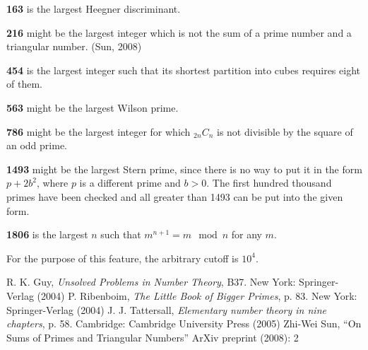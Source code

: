 \documentclass[12pt]{article}
\begin{document}
{\bf 163} is the largest Heegner discriminant.

{\bf 216} might be the largest integer which is not the sum of a prime number and a triangular number. (Sun, 2008)

{\bf 454} is the largest integer such that its shortest partition into cubes requires eight of them.

{\bf 563} might be the largest Wilson prime.

{\bf 786} might be the largest integer for which ${}_{2n}\!C_n$ is not divisible by the square of an odd prime.

{\bf 1493} might be the largest Stern prime, since there is no way to put it in the form $p + 2b^2$, where $p$ is a different prime and $b > 0$. The first hundred thousand primes have been checked and all greater than 1493 can be put into the given form.

{\bf 1806} is the largest $n$ such that $m^{n + 1} = m \mod n$ for any $m$.

For the purpose of this feature, the arbitrary cutoff is $10^4$.

\begin{thebibliography}{3}
 R. K. Guy, {\it Unsolved Problems in Number Theory}, B37. New York: Springer-Verlag (2004)
 P. Ribenboim, {\it The Little Book of Bigger Primes}, p. 83. New York: Springer-Verlag (2004)
 J. J. Tattersall, {\it Elementary number theory in nine chapters}, p. 58. Cambridge: Cambridge University Press (2005)
 Zhi-Wei Sun, ``On Sums of Primes and Triangular Numbers'' ArXiv preprint (2008): 2
\end{thebibliography}
\end{document}

